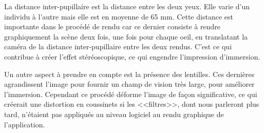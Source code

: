 \documentclass[a4paper,french,12pt]{article}
\begin{document}
			    La distance inter-pupillaire est la distance entre les deux yeux. Elle varie d'un individu
			    à l'autre mais elle est en moyenne de 65 mm. Cette distance est importante dans le procédé 
			    de rendu car ce dernier consiste à rendre graphiquement la scène deux fois, une fois pour
			    chaque oeil, en translatant la caméra de la distance inter-pupillaire entre les deux rendus.
			    C'est ce qui contribue à créer l'effet stéréoscopique, ce qui engendre l'impression d'immersion.
			
			    Un autre aspect à prendre en compte est la présence des lentilles. Ces dernières agrandissent
			    l'image pour fournir un champ de vision très large, pour améliorer l'immersion.
			    Cependant ce procédé déforme l'image de façon significative, ce qui créerait une distortion
			    en coussinets si les <<filtres>>, dont nous parleront plus tard,
			    n'étaient pas appliqués au niveau logiciel au rendu graphique de l'application.\\
			    
\end{document}
